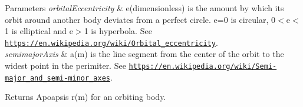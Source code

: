 \begin{DoxyParams}{Parameters}
{\em orbital\+Eccentricity} & e(dimensionless) is the amount by which its orbit around another body deviates from a perfect circle. e=0 is circular, 0$<$e$<$1 is elliptical and e$>$1 is hyperbola. See \href{https://en.wikipedia.org/wiki/Orbital_eccentricity}{\tt https\+://en.\+wikipedia.\+org/wiki/\+Orbital\+\_\+eccentricity}. \\
\hline
{\em semimajor\+Axis} & a(m) is the line segment from the center of the orbit to the widest point in the perimiter. See \href{https://en.wikipedia.org/wiki/Semi-major_and_semi-minor_axes}{\tt https\+://en.\+wikipedia.\+org/wiki/\+Semi-\/major\+\_\+and\+\_\+semi-\/minor\+\_\+axes}. \\
\hline
\end{DoxyParams}
\begin{DoxyReturn}{Returns}
Apoapsis r(m) for an orbiting body. 
\end{DoxyReturn}
